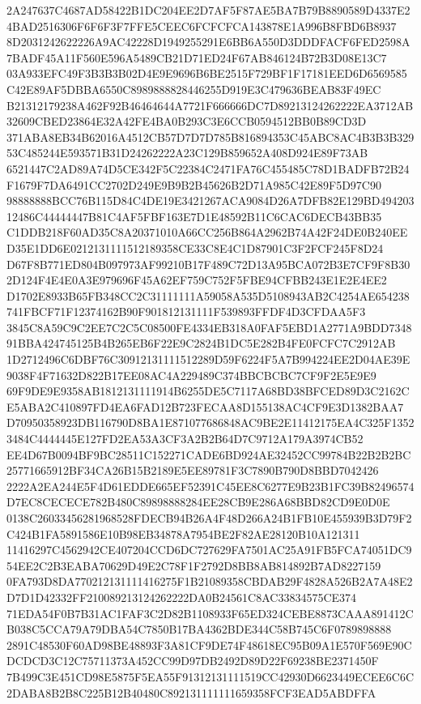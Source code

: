 \documentclass[UTF8,fontset=fandol,zihao=-4,a4paper]{ctexart}
\begin{document}
{{2A247637C4687AD58422B1DC204EE2D7AF5F87AE5BA7B79B8890589D4337E24BAD2516306F6F6F3F7FFE5CEEC6FCFCFCA143878E1A996B8FBD6B8937
8D2031242622226A9AC42228D1949255291E6BB6A550D3DDDFACF6FED2598A7BADF45A11F560E596A5489CB21D71ED24F67AB846124B72B3D08E13C7
03A933EFC49F3B3B3B02D4E9E9696B6BE2515F729BF1F17181EED6D6569585C42E89AF5DBBA6550C8989888828446255D919E3C479636BEAB83F49EC
B21312179238A462F92B46464644A7721F666666DC7D89213124262222EA3712AB32609CBED23864E32A42FE4BA0B293C3E6CCB0594512BB0B89CD3D
371ABA8EB34B62016A4512CB57D7D7D785B816894353C45ABC8AC4B3B3B32953C485244E593571B31D24262222A23C129B859652A408D924E89F73AB
6521447C2AD89A74D5CE342F5C22384C2471FA76C455485C78D1BADFB72B24F1679F7DA6491CC2702D249E9B9B2B45626B2D71A985C42E89F5D97C90
98888888BCC76B115D84C4DE19E3421267ACA9084D26A7DFB82E129BD49420312486C44444447B81C4AF5FBF163E7D1E48592B11C6CAC6DECB43BB35
C1DDB218F60AD35C8A20371010A66CC256B864A2962B74A42F24DE0B240EED35E1DD6E0212131111512189358CE33C8E4C1D87901C3F2FCF245F8D24
D67F8B771ED804B097973AF99210B17F489C72D13A95BCA072B3E7CF9F8B302D124F4E4E0A3E979696F45A62EF759C752F5FBE94CFBB243E1E2E4EE2
D1702E8933B65FB348CC2C31111111A59058A535D5108943AB2C4254AE654238741FBCF71F12374162B90F901812131111F539893FFDF4D3CFDAA5F3
3845C8A59C9C2EE7C2C5C08500FE4334EB318A0FAF5EBD1A2771A9BDD734891BBA424745125B4B265EB6F22E9C2824B1DC5E282B4FE0FCFC7C2912AB
1D2712496C6DBF76C30912131111512289D59F6224F5A7B994224EE2D04AE39E9038F4F71632D822B17EE08AC4A229489C374BBCBCBC7CF9F2E5E9E9
69F9DE9E9358AB1812131111914B6255DE5C7117A68BD38BFCED89D3C2162CE5ABA2C410897FD4EA6FAD12B723FECAA8D155138AC4CF9E3D1382BAA7
D70950358923DB116790D8BA1E871077686848AC9BE2E11412175EA4C325F13523484C4444445E127FD2EA53A3CF3A2B2B64D7C9712A179A3974CB52
EE4D67B0094BF9BC28511C152271CADE6BD924AE32452CC99784B22B2B2BC25771665912BF34CA26B15B2189E5EE89781F3C7890B790D8BBD7042426
2222A2EA244E5F4D61EDDE665EF52391C45EE8C6277E9B23B1FC39B82496574D7EC8CECECE782B480C89898888284EE28CB9E286A68BBD82CD9E0D0E
0138C26033456281968528FDECB94B26A4F48D266A24B1FB10E455939B3D79F2C424B1FA5891586E10B98EB34878A7954BE2F82AE28120B10A121311
11416297C4562942CE407204CCD6DC727629FA7501AC25A91FB5FCA74051DC954EE2C2B3EABA70629D49E2C78F1F2792D8BB8AB814892B7AD8227159
0FA793D8DA770212131111416275F1B21089358CBDAB29F4828A526B2A7A48E2D7D1D42332FF210089213124262222DA0B24561C8AC33834575CE374
71EDA54F0B7B31AC1FAF3C2D82B1108933F65ED324CEBE8873CAAA891412CB038C5CCA79A79DBA54C7850B17BA4362BDE344C58B745C6F0789898888
2891C48530F60AD98BE48893F3A81CF9DE74F48618EC95B09A1E570F569E90CDCDCD3C12C75711373A452CC99D97DB2492D89D22F69238BE2371450F
7B499C3E451CD98E5875F5EA55F91312131111519CC42930D6623449ECEE6C6C2DABA8B2B8C225B12B40480C892131111111659358FCF3EAD5ABDFFA
}}
\end{document}

